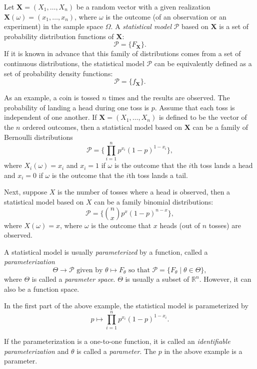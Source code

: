 \documentclass[12pt]{article}
\begin{document}
Let $\textbf{X}=(X_1,\ldots,X_n)$ be a random vector with a given realization 
$\textbf{X}(\omega)=(x_1,\ldots,x_n)$, where $\omega$ is the outcome (of an observation or an experiment) in the sample space $\Omega$.  A \emph{statistical model} $\mathcal{P}$ based on $\textbf{X}$ is a set of probability distribution functions of $\textbf{X}$: 
$$\mathcal{P}=\lbrace F_{\textbf{X}} \rbrace.$$
If it is known in advance that this family of distributions comes from a set of continuous distributions, the statistical model $\mathcal{P}$ can be equivalently defined as a set of probability density functions:
$$\mathcal{P}=\lbrace f_{\textbf{X}} \rbrace.$$
\par
As an example, a coin is tossed $n$ times and the results are observed.  The probability of landing a head during one toss is $p$.  Assume that each toss is independent of one another.  If $\textbf{X}=(X_1,\ldots,X_n)$ is defined to be the vector of the $n$ ordered outcomes, then a statistical model based on $\textbf{X}$ can be a family of Bernoulli distributions 
$$\mathcal{P}=\lbrace \prod_{i=1}^n p^{x_i}(1-p)^{1-x_i} \rbrace,$$
where $X_i(\omega)=x_i$ and $x_i=1$ if $\omega$ is the outcome that the $i$th toss lands a head and $x_i=0$ if $\omega$ is the outcome that the $i$th toss lands a tail.
\par
Next, suppose $X$ is the number of tosses where a head is observed, then a statistical model based on $X$ can be a family binomial distributions:
$$\mathcal{P}=\lbrace {n\choose x}p^x(1-p)^{n-x} \rbrace,$$
where $X(\omega)=x$, where $\omega$ is the outcome that $x$ heads (out of $n$ tosses) are observed.
\par
A statistical model is usually \emph{parameterized} by a function, called a \emph{parameterization} 
$$\Theta\rightarrow\mathcal{P}\mbox{ given by }\theta\mapsto F_{\theta}\mbox{ so that }\mathcal{P}=\lbrace F_{\theta} \mid \theta\in\Theta \rbrace,$$
where $\Theta$ is called a \emph{parameter space}.  $\Theta$ is usually a subset of $\mathbb{R}^n$.  However, it can also be a function space.
\par
In the first part of the above example, the statistical model is parameterized by $$p\mapsto\prod_{i=1}^n p^{x_i}(1-p)^{1-x_i}.$$
\par
If the parameterization is a one-to-one function, it is called an \emph{identifiable parameterization} and $\theta$ is called a \emph{parameter}.  The $p$ in the above example is a parameter.
\end{document}
